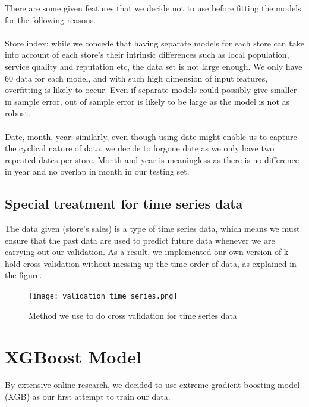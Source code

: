 \documentclass{article}
\begin{document}
There are some given features that we decide not to use before fitting the models for the following reasons. \\
\\
Store index: while we concede that having separate models for each store can take into account of each store’s their intrinsic differences such as local population, service quality and reputation etc, the data set is not large enough. We only have 60 data for each model, and with such high dimension of input features, overfitting is likely to occur. Even if separate models could possibly give smaller in sample error, out of sample error is likely to be large as the model is not as robust. \\
\\
Date, month, year: similarly, even though using date might enable us to capture the cyclical nature of data, we decide to forgone date as we only have two repeated dates per store. Month and year is meaningless as there is no difference in year and no overlap in month in our testing set. 

\subsection{Special treatment for time series data}
The data given (store’s sales) is a type of time series data, which means we must ensure that the past data are used to predict future data whenever we are carrying out our validation. As a result, we implemented our own version of k-hold cross validation without messing up the time order of data, as explained in the figure.  

\begin{figure}[h]
	\centering
	\texttt{[image: validation\_time\_series.png]}
	\caption{Method we use to do cross validation for time series data}
\end{figure}


\newpage
\section{XGBoost Model}

By extensive online research, we decided to use extreme gradient boosting model (XGB) as our first attempt to train our data. 
\end{document}
